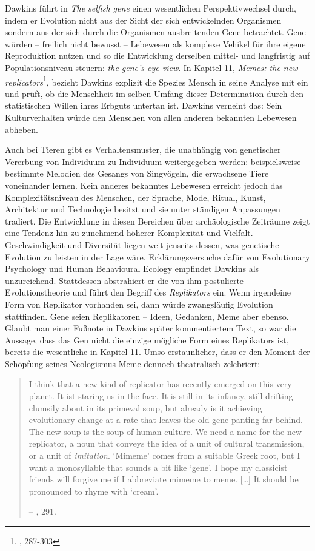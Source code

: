 \documentclass[openany,twoside,twocolumn]{book}
\let\rmarkdownfootnote\footnote%
\def\footnote{\protect\rmarkdownfootnote}
\begin{document}
Dawkins führt in \emph{The selfish gene} einen wesentlichen Perspektivwechsel durch, indem er Evolution nicht aus der Sicht der sich entwickelnden Organismen sondern aus der sich durch die Organismen ausbreitenden Gene betrachtet. Gene würden -- freilich nicht bewusst -- Lebewesen als komplexe Vehikel für ihre eigene Reproduktion nutzen und so die Entwicklung derselben mittel- und langfristig auf Populationsniveau steuern: \emph{the gene's eye view}. In Kapitel 11, \emph{Memes: the new replicators}\footnote{\textcite{Dawkinsselfishgene40th2016}, 287-303}, bezieht Dawkins explizit die Spezies Mensch in seine Analyse mit ein und prüft, ob die Menschheit im selben Umfang dieser Determination durch den statistischen Willen ihres Erbguts untertan ist. Dawkins verneint das: Sein Kulturverhalten würde den Menschen von allen anderen bekannten Lebewesen abheben.

Auch bei Tieren gibt es Verhaltensmuster, die unabhängig von genetischer Vererbung von Individuum zu Individuum weitergegeben werden: beispielsweise bestimmte Melodien des Gesangs von Singvögeln, die erwachsene Tiere voneinander lernen. Kein anderes bekanntes Lebewesen erreicht jedoch das Komplexitätsniveau des Menschen, der Sprache, Mode, Ritual, Kunst, Architektur und Technologie besitzt und sie unter ständigen Anpassungen tradiert. Die Entwicklung in diesen Bereichen über archäologische Zeiträume zeigt eine Tendenz hin zu zunehmend höherer Komplexität und Vielfalt. Geschwindigkeit und Diversität liegen weit jenseits dessen, was genetische Evolution zu leisten in der Lage wäre. Erklärungsversuche dafür von Evolutionary Psychology und Human Behavioural Ecology empfindet Dawkins als unzureichend. Stattdessen abstrahiert er die von ihm postulierte Evolutionstheorie und führt den Begriff des \emph{Replikators} ein. Wenn irgendeine Form von Replikator vorhanden sei, dann würde zwangsläufig Evolution stattfinden. Gene seien Replikatoren -- Ideen, Gedanken, Meme aber ebenso. Glaubt man einer Fußnote in Dawkins später kommentiertem Text, so war die Aussage, dass das Gen nicht die einzige mögliche Form eines Replikators ist, bereits die wesentliche in Kapitel 11. Umso erstaunlicher, dass er den Moment der Schöpfung seines Neologismus Meme dennoch theatralisch zelebriert:

\begin{quote}
I think that a new kind of replicator has recently emerged on this very planet. It ist staring us in the face. It is still in its infancy, still drifting clumsily about in its primeval soup, but already is it achieving evolutionary change at a rate that leaves the old gene panting far behind.
The new soup is the soup of human culture. We need a name for the new replicator, a noun that conveys the idea of a unit of cultural transmission, or a unit of \emph{imitation}. `Mimeme' comes from a suitable Greek root, but I want a monosyllable that sounds a bit like `gene'. I hope my classicist friends will forgive me if I abbreviate mimeme to meme. {[}\ldots{}{]} It should be pronounced to rhyme with `cream'.

-- \textcite{Dawkinsselfishgene40th2016}, 291.
\end{quote}
\end{document}
